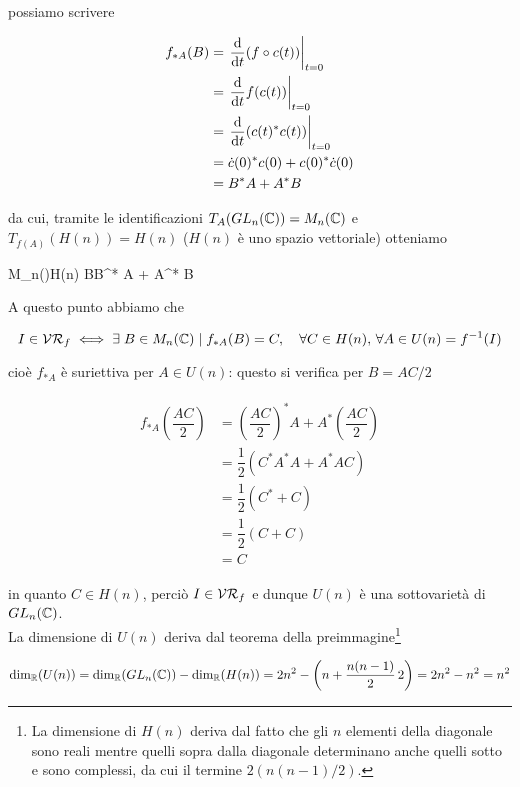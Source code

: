 possiamo scrivere

\begin{align}
	\begin{split}
		f_{*A}(B) &= \eval{ \dv{t} (f \circ c(t)) }_{t=0} \\
		&= \eval{ \dv{t} f(c(t)) }_{t=0} \\
		&= \eval{ \dv{t} (c(t)^{*} c(t)) }_{t=0} \\
		&= \dot{c}(0)^{*} c(0) + c(0)^{*} \dot{c}(0) \\
		&= B^{*} A + A^{*} B
	\end{split}
\end{align}

da cui, tramite le identificazioni $ T_{A}(GL_{n}(\mathbb{C})) = M_{n}(\mathbb{C}) $ e $ T_{f(A)}(H(n)) = H(n) $ ($ H(n) $ è uno spazio vettoriale) otteniamo

	{M_{n}(\C)}{H(n)}
	{B}{B^{*} A + A^{*} B}

A questo punto abbiamo che

\begin{equation}
	I \in \VR_{f} \iff \E B \in M_{n}(\C) \mid f_{*A}(B) = C %
	\qcomma \forall C \in H(n), \, \forall A \in U(n) = f^{-1}(I)
\end{equation}

cioè $ f_{*A} $ è suriettiva per $ A \in U(n) $: questo si verifica per $ B = AC/2 $

\begin{align}
	\begin{split}
		f_{*A} \left( \dfrac{A C}{2} \right) &= \left( \dfrac{A C}{2} \right)^{*} A + A^{*} \left( \dfrac{A C}{2} \right) \\
		&= \dfrac{1}{2} (C^{*} A^{*} A + A^{*} A C) \\
		&= \dfrac{1}{2} (C^{*} + C) \\
		&= \dfrac{1}{2} (C + C) \\
		&= C
	\end{split}
\end{align}

in quanto $ C \in H(n) $, perciò $ I \in \mathcal{VR}_{f} $ e dunque $ U(n) $ è una sottovarietà di $ GL_{n}(\mathbb{C}) $.\\
La dimensione di $ U(n) $ deriva dal teorema della preimmagine\footnote{%
	La dimensione di $ H(n) $ deriva dal fatto che gli $ n $ elementi della diagonale sono reali mentre quelli sopra dalla diagonale determinano anche quelli sotto e sono complessi, da cui il termine $ 2 (n(n-1)/2) $.%
}

\begin{equation}
	\dim_{\R}(U(n)) = \dim_{\R}(GL_{n}(\C)) - \dim_{\R}(H(n)) %
	= 2 n^{2} - \left( n +\dfrac{n (n-1)}{2} \, 2 \right) %
	= 2 n^{2} - n^{2} %
	= n^{2}
\end{equation}

